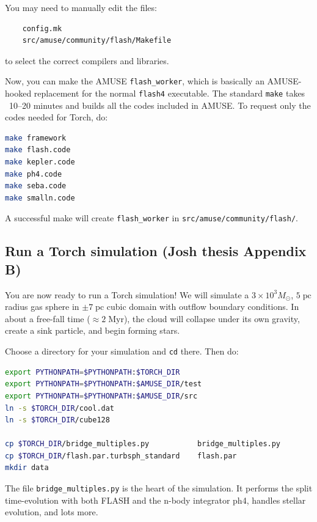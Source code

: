 \documentclass[10pt]{article}
\newcommand*{\mt}{\mathrm}
\newcommand*{\unit}[1]{\;\mt{#1}}  %
\newcommand*{\Msun}{M_\odot}
\begin{document}
You may need to manually edit the files:
\begin{verbatim}
    config.mk
    src/amuse/community/flash/Makefile
\end{verbatim}
to select the correct compilers and libraries.

Now, you can make the AMUSE \texttt{flash\_worker}, which is basically an
AMUSE-hooked replacement for the normal \texttt{flash4} executable.
The standard \texttt{make} takes ~10--20 minutes and builds all the codes
included in AMUSE.  To request only the codes needed for Torch, do:
\begin{lstlisting}[language=bash]
make framework
make flash.code
make kepler.code
make ph4.code
make seba.code
make smalln.code
\end{lstlisting}
A successful make will create \texttt{flash\_worker} in
\texttt{src/amuse/community/flash/}.

\subsection{Run a Torch simulation (Josh thesis Appendix B)}

You are now ready to run a Torch simulation!  We will simulate a
$3 \times 10^3 \Msun$, $5 \unit{pc}$ radius gas sphere in $\pm 7 \unit{pc}$
cubic domain with outflow boundary conditions.
In about a free-fall time ($\approx 2 \unit{Myr}$), the cloud will collapse
under its own gravity, create a sink particle, and begin forming stars.

Choose a directory for your simulation and \texttt{cd} there.  Then do:
\begin{lstlisting}[language=bash]
export PYTHONPATH=$PYTHONPATH:$TORCH_DIR
export PYTHONPATH=$PYTHONPATH:$AMUSE_DIR/test
export PYTHONPATH=$PYTHONPATH:$AMUSE_DIR/src
ln -s $TORCH_DIR/cool.dat
ln -s $TORCH_DIR/cube128

cp $TORCH_DIR/bridge_multiples.py           bridge_multiples.py
cp $TORCH_DIR/flash.par.turbsph_standard    flash.par
mkdir data
\end{lstlisting}

The file \texttt{bridge\_multiples.py} is the heart of the simulation.  It
performs the split time-evolution with both FLASH and the n-body integrator
ph4, handles stellar evolution, and lots more.
\end{document}

